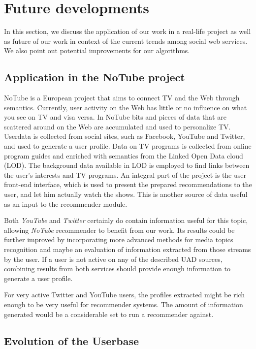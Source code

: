 \section{Future developments}
\label{sec:future}

In this section, we discuss the application of our work in a real-life project
as well as future of our work in context of the current
trends among social web services. We also point out potential improvements for
our algorithms.

\subsection{Application in the NoTube project}

NoTube is a European project that aims to connect TV and the Web through
semantics. Currently, user activity on the Web has little or no influence on
what you see on TV and visa versa. In NoTube bits and pieces of data that are
scattered around on the Web are accumulated and used to personalize TV. Userdata
is collected from social sites, such as Facebook, YouTube and Twitter, and used
to generate a user profile. Data on TV programs is collected from online program
guides and enriched with semantics from the Linked Open Data cloud (LOD). The
background data available in LOD is employed to find links between the user's
interests and TV programs. An integral part of the project is the user front-end
interface, which is used to present the prepared recommendations to the user,
and let him actually watch the shows. This is another source of data useful as
an input to the recommender module.

Both \textit{YouTube} and \textit{Twitter} certainly do contain information
useful for this topic, allowing \textit{NoTube} recommender to benefit from
our work. Its results could be further improved by incorporating more advanced methods
for media topics recognition and maybe an evaluation of information extracted
from those streams by the user. If a user is not active on any of the described
UAD sources, combining results from both services should provide enough information
to generate a user profile.

For very active Twitter and YouTube users, the profiles extracted
might be rich enough to be very useful for recommender systems. The amount of
information generated would be a considerable set to run a recommender against.

\subsection{Evolution of the Userbase}


